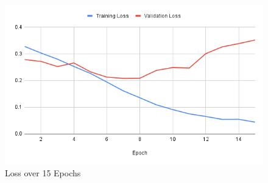 \documentclass[10pt]{article}
\begin{document}

\begin{figure} [H]
    \centering
    \includegraphics[width=1\linewidth]{images/Training Loss.png}
    \caption{Loss over 15 Epochs}
    \label{fig:Loss_Chart}
\end{figure}
\end{document}
